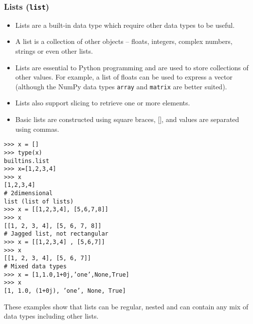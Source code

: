 \documentclass[KSmain.tex]{subfiles}
\begin{document}
\subsubsection{Lists (\texttt{list})}
\begin{itemize}
\item Lists are a built-in data type which require other data types to be useful. 
\item A list is a collection of other objects
– floats, integers, complex numbers, strings or even other lists. 
\item Lists are essential to Python programming
and are used to store collections of other values. For example, a list of floats can be used to express a vector
(although the NumPy data types \texttt{array} and \texttt{matrix} are better suited). 
\item Lists also support slicing to retrieve
one or more elements. 
\item Basic lists are constructed using square braces, [], and values are separated using
commas.
\end{itemize}
\begin{framed}
\begin{verbatim}
>>> x = []
>>> type(x)
builtins.list
>>> x=[1,2,3,4]
>>> x
[1,2,3,4]
# 2dimensional
list (list of lists)
>>> x = [[1,2,3,4], [5,6,7,8]]
>>> x
[[1, 2, 3, 4], [5, 6, 7, 8]]
# Jagged list, not rectangular
>>> x = [[1,2,3,4] , [5,6,7]]
>>> x
[[1, 2, 3, 4], [5, 6, 7]]
# Mixed data types
>>> x = [1,1.0,1+0j,’one’,None,True]
>>> x
[1, 1.0, (1+0j), ’one’, None, True]
\end{verbatim}
\end{framed}
These examples show that lists can be regular, nested and can contain any mix of data types including
other lists.

\newpage
\end{document}
